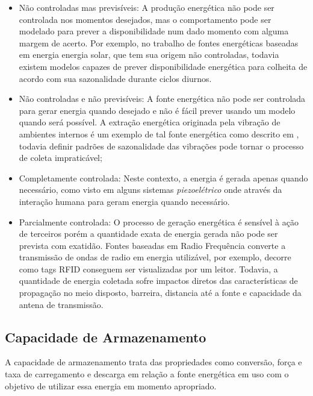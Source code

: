 \begin{itemize}

    \item Não controladas mas previsíveis: A produção energética não pode ser controlada nos momentos desejados, mas o comportamento pode ser modelado para prever a disponibilidade num dado momento com alguma margem de acerto. Por exemplo, no trabalho de  \cite{lee_energy_2018} fontes energéticas baseadas em energia energia solar, que tem sua origem não controladas, todavia existem modelos capazes de prever  disponibilidade energética para colheita de acordo com sua sazonalidade durante ciclos diurnos.
    
    \item Não controladas e não previsíveis: A fonte energética não pode ser controlada para gerar energia quando desejado e não é fácil prever usando um modelo quando será possível. A extração energética originada pela vibração de ambientes internos é um exemplo de tal fonte energética como descrito em \cite{wei_comprehensive_2017}, todavia definir padrões de sazonalidade das vibrações pode tornar o processo de coleta impraticável;
    
    \item Completamente controlada: Neste contexto, a energia é gerada apenas quando necessário, como visto em alguns sistemas \textit{piezoelétrico} onde através da interação humana para geram energia quando necessário.
    
    \item Parcialmente controlada: O processo de geração energética é sensível à ação de terceiros porém a quantidade exata de energia gerada não pode ser prevista com exatidão. Fontes baseadas em Radio Frequência converte a transmissão de ondas de radio em energia utilizável, por exemplo, \cite{shaikh_energy_2016} decorre como tags \acf{RFID} conseguem ser visualizadas por um leitor. Todavia, a quantidade de energia coletada sofre impactos diretos das características de propagação no meio disposto, barreira, distancia até a fonte e capacidade da antena de transmissão.
\end{itemize}

\subsection{Capacidade de Armazenamento}\label{Capacidade de Armazenamento}
A capacidade de armazenamento trata das propriedades como conversão, força e taxa de carregamento e descarga em relação a fonte energética em uso com o objetivo de utilizar essa energia em momento apropriado. 

